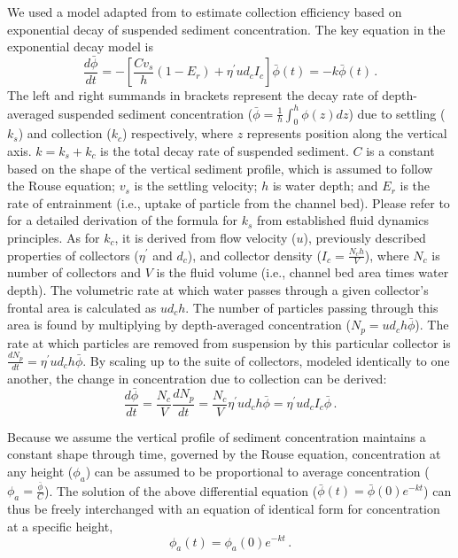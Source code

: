 \documentclass{scrreprt}
\begin{document}
We used a model adapted from \cite{Fauria_2015} to estimate collection efficiency based on exponential decay of suspended sediment concentration. The key equation in the exponential decay model is
\begin{equation}
    \frac{d\bar{\phi}}{dt} = -[\frac{Cv_s}{h}(1-E_r) + \eta^{\prime}ud_cI_c]\bar{\phi}(t) = -k\bar{\phi}(t)\,.
    \label{eq:model}    
\end{equation}
The left and right summands in brackets represent the decay rate of depth-averaged suspended sediment concentration ($\bar{\phi} = \frac{1}{h} \int_0^h\phi(z)dz$) due to settling ($k_s$) and collection ($k_c$) respectively, where $z$ represents position along the vertical axis. $k = k_s + k_c$ is the total decay rate of suspended sediment.  $C$ is a constant based on the shape of the vertical sediment profile, which is assumed to follow the Rouse equation; $v_s$ is the settling velocity; $h$ is water depth; and $E_r$ is the rate of entrainment (i.e., uptake of particle from the channel bed). Please refer to \cite{Fauria_2015} for a detailed derivation of the formula for $k_s$ from established fluid dynamics principles. As for $k_c$, it is derived from flow velocity ($u$), previously described properties of collectors ($\eta^\prime$ and $d_c$), and collector density ($I_c = \frac{N_ch}{V}$), where $N_c$ is number of collectors and $V$ is the fluid volume (i.e., channel bed area times water depth). The volumetric rate at which water passes through a given collector's frontal area is calculated as $ud_ch$. The number of particles passing through this area is found by multiplying by depth-averaged concentration ($N_p = ud_ch\bar{\phi}$). The rate at which particles are removed from suspension by this particular collector is $\frac{dN_p}{dt}=\eta^{\prime}ud_ch\bar{\phi}$. By scaling up to the suite of collectors, modeled identically to one another, the change in concentration due to collection can be derived:
\begin{equation}
\frac{d\bar{\phi}}{dt} = \frac{N_c}{V}\frac{dN_p}{dt} = \frac{N_c}{V}\eta^{\prime}ud_ch\bar{\phi} = \eta^{\prime}ud_cI_c\bar{\phi}\,.
\label{eq:collection}
\end{equation}

Because we assume the vertical profile of sediment concentration maintains a constant shape through time, governed by the Rouse equation, concentration at any height ($\phi_a$) can be assumed to be proportional to average concentration ($\phi_a=\frac{\bar{\phi}}{C}$). The solution of the above differential equation ($\bar{\phi}(t) = \bar{\phi}(0)e^{-kt}$) can thus be freely interchanged with an equation of identical form for concentration at a specific height,
\begin{equation}
    \phi_a(t) = \phi_a(0)e^{-kt}\,.
    \label{eq:specconc}
\end{equation}
\end{document}
